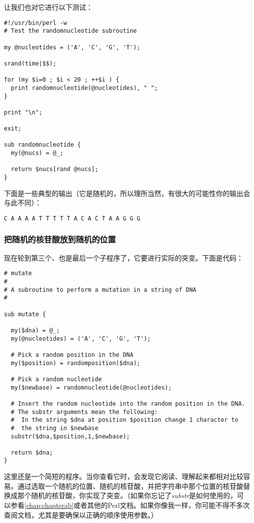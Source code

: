 让我们也对它进行以下测试：

\begin{lstlisting}
#!/usr/bin/perl -w
# Test the randomnucleotide subroutine

my @nucleotides = ('A', 'C', 'G', 'T');

srand(time|$$);

for (my $i=0 ; $i < 20 ; ++$i ) {
  print randomnucleotide(@nucleotides), " ";
}

print "\n";

exit;

sub randomnucleotide {
  my(@nucs) = @_;

  return $nucs[rand @nucs];
}
\end{lstlisting}

下面是一些典型的输出（它是随机的，所以理所当然，有很大的可能性你的输出会与此不同）：

\begin{lstlisting}
C A A A A T T T T T A C A C T A A G G G 
\end{lstlisting}

\subsubsection{把随机的核苷酸放到随机的位置}
现在轮到第三个、也是最后一个子程序了，它要进行实际的突变。下面是代码：

\begin{lstlisting}
# mutate
#
# A subroutine to perform a mutation in a string of DNA
#

sub mutate {

  my($dna) = @_;
  my(@nucleotides) = ('A', 'C', 'G', 'T');

  # Pick a random position in the DNA
  my($position) = randomposition($dna);

  # Pick a random nucleotide
  my($newbase) = randomnucleotide(@nucleotides);

  # Insert the random nucleotide into the random position in the DNA.
  # The substr arguments mean the following:
  #  In the string $dna at position $position change 1 character to
  #  the string in $newbase
  substr($dna,$position,1,$newbase);

  return $dna;
}
\end{lstlisting}

这里还是一个简短的程序。当你查看它时，会发现它阅读、理解起来都相对比较容易。通过选取一个随机的位置、随机的核苷酸，并把字符串中那个位置的核苷酸替换成那个随机的核苷酸，你实现了突变。（如果你忘记了\textit{substr}是如何使用的，可以参看\autoref{chap:chapterab}或者其他的Perl文档。如果你像我一样，你可能不得不多次查阅文档，尤其是要确保以正确的顺序使用参数。）

